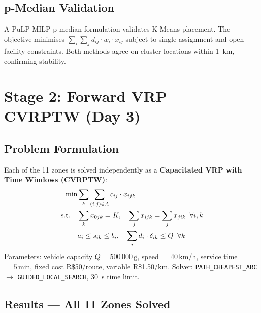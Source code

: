 \documentclass[11pt,a4paper]{article}
\begin{document}
\subsection{p-Median Validation}
A PuLP MILP p-median formulation validates K-Means placement.
The objective minimises $\sum_i \sum_j d_{ij} \cdot w_i \cdot x_{ij}$
subject to single-assignment and open-facility constraints.
Both methods agree on cluster locations within 1~km, confirming stability.

\section{Stage 2: Forward VRP --- CVRPTW (Day 3)}

\subsection{Problem Formulation}
Each of the 11 zones is solved independently as a
\textbf{Capacitated VRP with Time Windows (CVRPTW)}:
\begin{align}
  \min &\sum_k \sum_{(i,j) \in A} c_{ij} \cdot x_{ijk} \notag\\
  \text{s.t.} \quad & \sum_k x_{0jk} = K, \quad
    \sum_j x_{ijk} = \sum_j x_{jik} \;\; \forall i,k \notag\\
  & a_i \leq s_{ik} \leq b_i, \quad
    \sum_i d_i \cdot \delta_{ik} \leq Q \;\; \forall k \notag
\end{align}
Parameters: vehicle capacity $Q = 500{\,}000\,\text{g}$,
speed $= 40\,\text{km/h}$, service time $= 5\,\text{min}$,
fixed cost R\$50/route, variable R\$1.50/km.
Solver: \texttt{PATH\_CHEAPEST\_ARC} $\to$ \texttt{GUIDED\_LOCAL\_SEARCH},
30~s time limit.

\subsection{Results --- All 11 Zones Solved}
\end{document}
